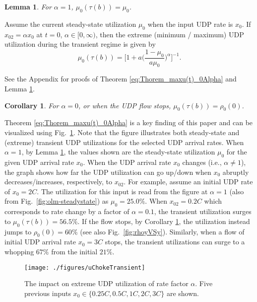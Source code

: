 \documentclass{IEEEtran}
\newtheorem{lemma}{Lemma}
\begin{document}
    \begin{lemma}\label{lemma:alpha1}
        For $\alpha=1$, $\mu_0(\tau(b))=\mu_0$.
    \end{lemma}

     \begin{theorem}\label{eq:Thorem_maxu(t)_0Alpha}
        Assume the current steady-state utilization $\mu_0$ when the input UDP rate is $x_0$. If $x_{02}=\alpha x_0$ at $t=0$, $\alpha \in[0,\infty)$, then the extreme (minimum / maximum) UDP utilization during the transient regime is given by
        \begin{equation}\label{eq:alphaU}
            \mu_0(\tau(b))= \bigg[1+a\bigg(\frac{1-\mu_0}{a\mu_0}\bigg)^{\alpha}\bigg]^{-1}.
        \end{equation}
    \end{theorem}

    See the Appendix for proofs of Theorem \ref{eq:Thorem_maxu(t)_0Alpha} and Lemma \ref{lemma:alpha1}.
    \newtheorem{corollary}{Corollary}
     \begin{corollary}\label{cor:alpha0}
        For $\alpha=0$, or when the UDP flow stops, $\mu_0(\tau(b))=\rho_0(0)$.
    \end{corollary}

    Theorem \ref{eq:Thorem_maxu(t)_0Alpha} is a key finding of this paper and can be visualized using Fig.~\ref{fig:uChokeTransientTheory}. Note that the figure illustrates both steady-state and (extreme) transient UDP utilizations for the selected UDP arrival rates. When $\alpha=1$, by Lemma \ref{lemma:alpha1}, the values shown are the steady-state utilization $\mu_0$ for the given UDP arrival rate $x_0$.  When the UDP arrival rate $x_0$  changes (i.e., $\alpha \neq 1$),  the graph shows how far the UDP utilization can go up/down when  $x_0$ abruptly decreases/increases, respectively, to $x_{02}$. For example, assume an initial UDP rate of $x_0=2C$. The utilization for this input is read from the figure at $\alpha=1$ (also from Fig.~\ref{fig:olm-steadystate}) as $\mu_0=25.0\%$. When $x_{02}=0.2C$ which corresponds to rate change by a factor of $\alpha=0.1$, the transient utilization surges to $\mu_0(\tau(b))=56.5\%$. If the flow stops, by Corollary \ref{cor:alpha0}, the utilization instead jumps to $\rho_0(0)=60\%$ (see also Fig.~\ref{fig:rhoyVSy}). Similarly, when a flow of initial UDP arrival rate $x_0=3C$ stops, the transient utilizations can surge to a whopping $67\%$  from the initial $21\%$. 

    \begin{figure}[thb!]
            \centering
            \texttt{[image: ./figures/uChokeTransient]}\caption{The impact on extreme UDP utilization of rate factor $\alpha$. Five previous inputs $x_0 \in\{0.25C,0.5C,1C, 2C, 3C\}$ are shown.}
            \label{fig:uChokeTransientTheory}
    \end{figure}
\end{document}
